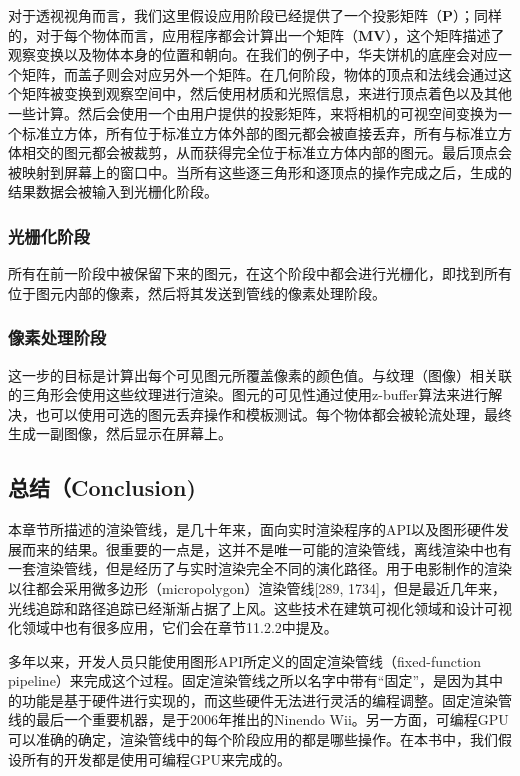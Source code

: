 \documentclass[
  paper=a4,
  ,captions=tableheading
]{scrartcl}
\begin{document}
对于透视视角而言，我们这里假设应用阶段已经提供了一个投影矩阵（\(\mathbf{P}\)）；同样的，对于每个物体而言，应用程序都会计算出一个矩阵（\(\mathbf{MV}\)），这个矩阵描述了观察变换以及物体本身的位置和朝向。在我们的例子中，华夫饼机的底座会对应一个矩阵，而盖子则会对应另外一个矩阵。在几何阶段，物体的顶点和法线会通过这个矩阵被变换到观察空间中，然后使用材质和光照信息，来进行顶点着色以及其他一些计算。然后会使用一个由用户提供的投影矩阵，来将相机的可视空间变换为一个标准立方体，所有位于标准立方体外部的图元都会被直接丢弃，所有与标准立方体相交的图元都会被裁剪，从而获得完全位于标准立方体内部的图元。最后顶点会被映射到屏幕上的窗口中。当所有这些逐三角形和逐顶点的操作完成之后，生成的结果数据会被输入到光栅化阶段。

\subsubsection{光栅化阶段}\label{ux5149ux6805ux5316ux9636ux6bb5-1}

所有在前一阶段中被保留下来的图元，在这个阶段中都会进行光栅化，即找到所有位于图元内部的像素，然后将其发送到管线的像素处理阶段。

\subsubsection{像素处理阶段}\label{ux50cfux7d20ux5904ux7406ux9636ux6bb5-1}

这一步的目标是计算出每个可见图元所覆盖像素的颜色值。与纹理（图像）相关联的三角形会使用这些纹理进行渲染。图元的可见性通过使用z-buffer算法来进行解决，也可以使用可选的图元丢弃操作和模板测试。每个物体都会被轮流处理，最终生成一副图像，然后显示在屏幕上。

\subsection{总结（Conclusion)}\label{ux603bux7ed3conclusion}

本章节所描述的渲染管线，是几十年来，面向实时渲染程序的API以及图形硬件发展而来的结果。很重要的一点是，这并不是唯一可能的渲染管线，离线渲染中也有一套渲染管线，但是经历了与实时渲染完全不同的演化路径。用于电影制作的渲染以往都会采用微多边形（micropolygon）渲染管线{[}289,
1734{]}，但是最近几年来，光线追踪和路径追踪已经渐渐占据了上风。这些技术在建筑可视化领域和设计可视化领域中也有很多应用，它们会在章节11.2.2中提及。

多年以来，开发人员只能使用图形API所定义的固定渲染管线（fixed-function
pipeline）来完成这个过程。固定渲染管线之所以名字中带有``固定''，是因为其中的功能是基于硬件进行实现的，而这些硬件无法进行灵活的编程调整。固定渲染管线的最后一个重要机器，是于2006年推出的Ninendo
Wii。另一方面，可编程GPU可以准确的确定，渲染管线中的每个阶段应用的都是哪些操作。在本书中，我们假设所有的开发都是使用可编程GPU来完成的。
\end{document}

